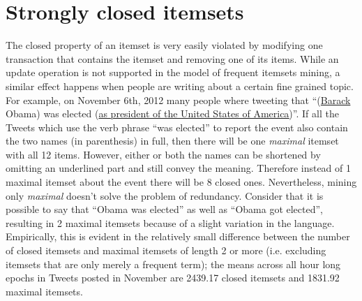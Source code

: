 \documentclass{sig-alternate}
\begin{document}
\section{Strongly closed itemsets}
\label{sec:strong}
The closed property of an itemset is very easily violated by modifying one transaction that contains the itemset and removing one of its items. While an update operation is not supported in the model of frequent itemsets mining, a similar effect happens when people are writing about a certain fine grained topic. For example, on November 6th, 2012 many people where tweeting that ``(\underline{Barack} Obama) was elected (\underline{as president \underline{of the United States \underline{of America}}})''. If all the Tweets which use the verb phrase ``was elected'' to report the event also contain the two names (in parenthesis) in full, then there will be one  \emph{maximal}  itemset with all 12 items. However, either or both the names can be shortened by omitting an underlined part and still convey the meaning. 
Therefore instead of 1 maximal itemset about the event there will be 8 closed ones. Nevertheless, mining only \emph{maximal} doesn't solve the problem of redundancy. Consider that it is possible to say that ``Obama was elected'' as well as ``Obama got elected'', resulting in 2 maximal itemsets because of a slight variation in the language. Empirically, this is evident in the relatively small difference between the number of closed itemsets and maximal itemsets of length 2 or more (i.e. excluding itemsets that are only merely a frequent term); the means across all hour long epochs in Tweets posted in November are 2439.17 closed itemsets and 1831.92 maximal itemsets. 
\end{document}
